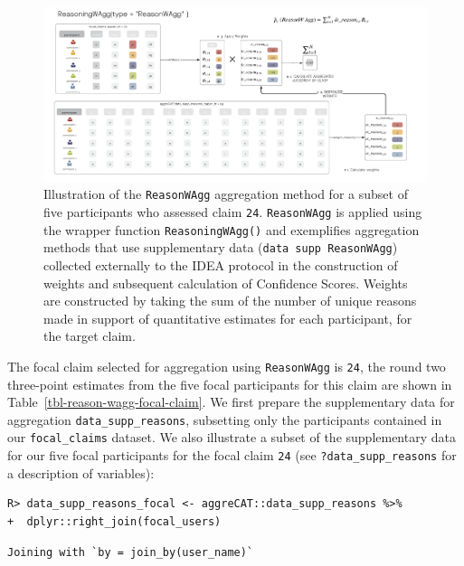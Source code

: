 \documentclass[article]{jss}
\begin{document}
\begin{figure}

{\centering \includegraphics[width=5.82in,height=\textheight]{images/ReasonWAgg.png}

}

\caption{\label{fig-ReasonWAgg}Illustration of the \texttt{ReasonWAgg}
aggregation method for a subset of five participants who assessed claim
\texttt{24}. \texttt{ReasonWAgg} is applied using the wrapper function
\texttt{ReasoningWAgg()} and exemplifies aggregation methods that use
supplementary data (\texttt{data~supp~ReasonWAgg}) collected externally
to the IDEA protocol in the construction of weights and subsequent
calculation of Confidence Scores. Weights are constructed by taking the
sum of the number of unique reasons made in support of quantitative
estimates for each participant, for the target claim.}

\end{figure}

The focal claim selected for aggregation using \texttt{ReasonWAgg} is
\texttt{24}, the round two three-point estimates from the five focal
participants for this claim are shown in
Table~\ref{tbl-reason-wagg-focal-claim}. We first prepare the
supplementary data for aggregation \texttt{data\_supp\_reasons},
subsetting only the participants contained in our \texttt{focal\_claims}
dataset. We also illustrate a subset of the supplementary data for our
five focal participants for the focal claim \texttt{24} (see
\texttt{?data\_supp\_reasons} for a description of variables):

\begin{verbatim}
R> data_supp_reasons_focal <- aggreCAT::data_supp_reasons %>%  
+  dplyr::right_join(focal_users)
\end{verbatim}

\begin{verbatim}
Joining with `by = join_by(user_name)`
\end{verbatim}
\end{document}
